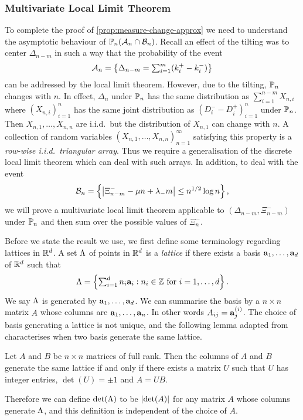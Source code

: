 \subsubsection{Multivariate Local Limit Theorem}\label{subsec:multivarlocallimit}

To complete the proof of \cref{prop:measure-change-approx} we need to understand the asymptotic behaviour of $\P_n(\lltEvent_n \cap \omegaEvent_n)$. Recall an effect of the tilting was to center $\Delta_{n-m}$ in such a way that the probability of the event
\begin{equation*}
    \lltEvent_n = \left\{ 
        \Delta_{n-m} = \textstyle \sum_{i=1}^m (k_i^+ - k_i^-)
    \right\}
\end{equation*}
can be addressed by the local limit theorem. However, due to the tilting, $\P_n$ changes with $n$. In effect, $\Delta_n$ under $\P_n$ has the same distribution as $\sum_{i=1}^{n-m} X_{n, i}$ where $(X_{n, i})_{i=1}^n$ has the same joint distribution as $(D_i^- - D_i^+)_{i=1}^n$ under $\P_n$. Then $X_{n, 1}, \ldots, X_{n, n}$ are i.i.d.\ but the distribution of $X_{n, 1}$ can change with $n$. A collection of random variables $(X_{n, 1}, \ldots, X_{n, n})_{n = 1}^{\infty}$ satisfying this property is a \emph{row-wise i.i.d.\ triangular array}. Thus we require a generalisation of the discrete local limit theorem which can deal with such arrays. In addition, to deal with the event
\begin{equation*}
    \omegaEvent_n = \left\{ 
        \abs*{\Xi_{n-m}^- - \mu n + \lambda_- m} \leq n^{1/2} \log n
    \right\},
\end{equation*}
we will prove a multivariate local limit theorem applicable to $(\Delta_{n-m}, \Xi^-_{n-m})$ under $\P_n$ and then sum over the possible values of $\Xi^-_n$.

Before we state the result we use, we first define some terminology regarding lattices in $\R^d$. A set $\lattice$ of points in $\R^d$ is a \emph{lattice} if there exists a basis $\va_1, \ldots, \va_d$ of $\R^d$ such that
\begin{equation*}
    \lattice = \left\{ 
        \textstyle \sum_{i=1}^d n_i \va_i : n_i \in \Z \text{ for $i = 1, \ldots, d$}
    \right\}.
\end{equation*}
We say $\lattice$ is generated by $\va_1, \ldots, \va_d$. We can summarise the basis by a $n \times n$ matrix $A$ whose columns are $\va_1, \ldots, \va_n$. In other words $A_{ij} = \va_j^{(i)}$. The choice of basis generating a lattice is not unique, and the following lemma adapted from \cite[Corollary 4.3a]{schrijverTheoryLinearInteger1998} characterises when two basis generate the same lattice.
\begin{lemma}
    Let $A$ and $B$ be $n \times n$ matrices of full rank. Then the columns of $A$ and $B$ generate the same lattice if and only if there exists a matrix $U$ such that $U$ has integer entries, $\det(U) = \pm 1$ and $A = UB$.
\end{lemma}
Therefore we can define $\det(\lattice)$ to be $\abs{\det(A)}$ for any matrix $A$ whose columns generate $\lattice$, and this definition is independent of the choice of $A$.

